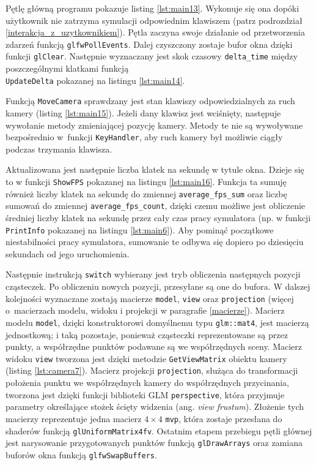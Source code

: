\documentclass[12pt, twoside, openany]{report}
\begin{document}
Pętlę główną programu pokazuje listing \ref{lst:main13}. Wykonuje się ona dopóki użytkownik nie zatrzyma symulacji odpowiednim klawiszem (patrz podrozdział \ref{interakcja_z_uzytkownikiem}). Pętla zaczyna swoje działanie od przetworzenia zdarzeń funkcją \texttt{glfwPollEvents}. Dalej czyszczony zostaje bufor okna dzięki funkcji \texttt{glClear}. Następnie wyznaczany jest skok czasowy \texttt{delta\_time} między poszczególnymi klatkami funkcją\\\texttt{UpdateDelta} pokazanej na listingu \ref{lst:main14}.

Funkcją \texttt{MoveCamera} sprawdzany jest stan klawiszy odpowiedzialnych za ruch kamery (listing \ref{lst:main15}). Jeżeli dany klawisz jest wciśnięty, następuje wywołanie metody zmieniającej pozycję kamery. Metody te nie są wywoływane bezpośrednio w~funkcji \texttt{KeyHandler}, aby ruch kamery był możliwie ciągły podczas trzymania klawisza.

Aktualizowana jest następnie liczba klatek na sekundę w tytule okna. Dzieje się to w funkcji \texttt{ShowFPS} pokazanej na listingu \ref{lst:main16}. Funkcja ta sumuję również liczby klatek na sekundę do zmiennej \texttt{average\_fps\_sum} oraz liczbę sumowań do zmiennej \texttt{average\_fps\_count}, dzięki czemu możliwe jest obliczenie średniej liczby klatek na sekundę przez cały czas pracy symulatora (np. w funkcji \texttt{PrintInfo} pokazanej na listingu \ref{lst:main6}). Aby pominąć początkowe niestabilności pracy symulatora, sumowanie te odbywa się dopiero po dziesięciu sekundach od jego uruchomienia.

Następnie instrukcją \texttt{switch} wybierany jest tryb obliczenia następnych pozycji cząsteczek. Po obliczeniu nowych pozycji, przesyłane są one do bufora. W dalszej kolejności wyznaczane zostają macierze \texttt{model}, \texttt{view} oraz \texttt{projection} (więcej o~macierzach modelu, widoku i projekcji w paragrafie \ref{macierze}). Macierz modelu \texttt{model}, dzięki konstruktorowi domyślnemu typu \texttt{glm::mat4}, jest macierzą jednostkową; i taką pozostaje, ponieważ cząsteczki reprezentowane są przez punkty, a współrzędne punktów podawane są we współrzędnych sceny. Macierz widoku \texttt{view} tworzona jest dzięki metodzie \texttt{GetViewMatrix} obiektu kamery (listing \ref{lst:camera7}). Macierz projekcji \texttt{projection}, służąca do transformacji położenia punktu we współrzędnych kamery do współrzędnych przycinania, tworzona jest dzięki funkcji biblioteki GLM \texttt{perspective}, która przyjmuje parametry określające stożek ścięty widzenia (ang. \textit{view frustum}). Złożenie tych macierzy reprezentuje jedna macierz $4\times 4$ \texttt{mvp}, która zostaje przesłana do shaderów funkcją \texttt{glUniformMatrix4fv}.
Ostatnim etapem przebiegu pętli głównej jest narysowanie przygotowanych punktów funkcją \texttt{glDrawArrays} oraz zamiana buforów okna funkcją \texttt{glfwSwapBuffers}.
\end{document}
